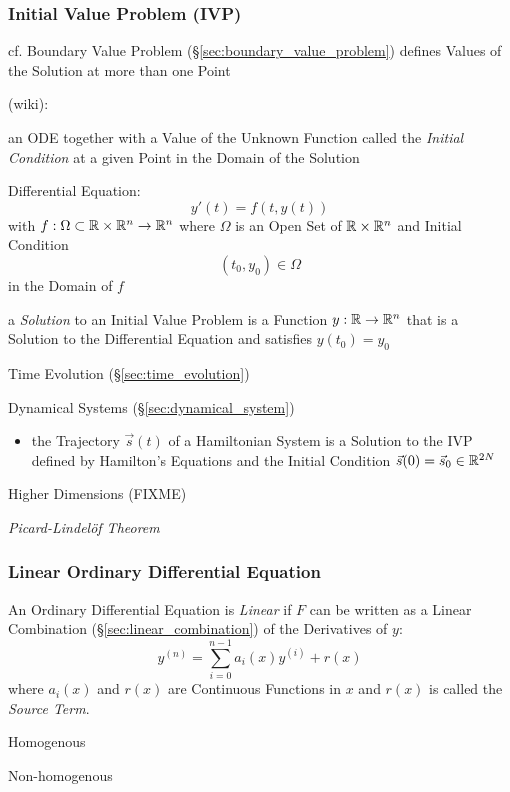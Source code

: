 \subsubsection{Initial Value Problem (IVP)}\label{sec:ivp}

\fist cf. Boundary Value Problem (\S\ref{sec:boundary_value_problem}) defines
Values of the Solution at more than one Point

(wiki):

an ODE together with a Value of the Unknown Function called the \emph{Initial
  Condition} at a given Point in the Domain of the Solution

Differential Equation:
\[
  y'(t) = f(t, y(t))
\]
with $f : \Omega \subset \mathbb{R} \times \mathbb{R}^n \rightarrow \mathbb{R}^n$ where
$\Omega$ is an Open Set of $\mathbb{R} \times \mathbb{R}^n$ and Initial Condition
\[
  (t_0, y_0) \in \Omega
\]
in the Domain of $f$

a \emph{Solution} to an Initial Value Problem is a Function $y : \mathbb{R}
\rightarrow \mathbb{R}^n$ that is a Solution to the Differential Equation and
satisfies $y(t_0) = y_0$

\fist Time Evolution (\S\ref{sec:time_evolution})

\fist Dynamical Systems (\S\ref{sec:dynamical_system})

\begin{itemize}
  \item the Trajectory $\vec{s}(t)$ of a Hamiltonian System is a Solution to
    the IVP defined by Hamilton's Equations and the Initial Condition
    $\vec{s}(0) = \vec{s}_0 \in \mathbb{R}^{2N}$
\end{itemize}

Higher Dimensions (FIXME)

\emph{Picard-Lindel\"of Theorem}



\subsubsection{Linear Ordinary Differential Equation}\label{sec:linear_ode}

An Ordinary Differential Equation is \emph{Linear} if $F$ can be written as a
Linear Combination (\S\ref{sec:linear_combination}) of the Derivatives of $y$:
\[
  y^{(n)} = \sum_{i=0}^{n-1} a_i(x)y^{(i)} + r(x)
\]
where $a_i(x)$ and $r(x)$ are Continuous Functions in $x$ and $r(x)$ is called
the \emph{Source Term}.

Homogenous

Non-homogenous



